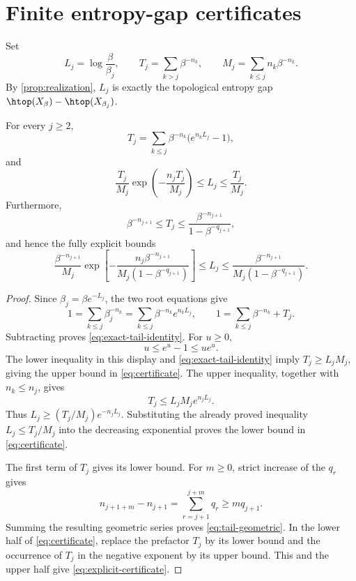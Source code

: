 \section{Finite entropy-gap certificates}
\label{sec:certificates}

Set
\begin{equation}
 L_j=\log\frac{\beta}{\beta_j},\qquad
 T_j=\sum_{k>j}\beta^{-n_k},\qquad
 M_j=\sum_{k\leq j}n_k\beta^{-n_k}.
 \label{eq:LTM}
\end{equation}
By \cref{prop:realization}, $L_j$ is exactly the topological entropy gap $\htop(X_\beta)-\htop(X_{\beta_j})$.

\begin{theorem}
\label{thm:finite-certificate}
For every $j\geq2$,
\begin{equation}
 T_j=\sum_{k\leq j}\beta^{-n_k}\bigl(e^{n_kL_j}-1\bigr),
 \label{eq:exact-tail-identity}
\end{equation}
and
\begin{equation}
 \boxed{
 \frac{T_j}{M_j}\exp\!\left(-\frac{n_jT_j}{M_j}\right)
 \leq L_j\leq\frac{T_j}{M_j}.}
 \label{eq:certificate}
\end{equation}
Furthermore,
\begin{equation}
 \beta^{-n_{j+1}}\leq T_j\leq
 \frac{\beta^{-n_{j+1}}}{1-\beta^{-q_{j+1}}},
 \label{eq:tail-geometric}
\end{equation}
and hence the fully explicit bounds
\begin{equation}
 \frac{\beta^{-n_{j+1}}}{M_j}
 \exp\!\left[
 -\frac{n_j\beta^{-n_{j+1}}}
 {M_j(1-\beta^{-q_{j+1}})}\right]
 \leq L_j\leq
 \frac{\beta^{-n_{j+1}}}
 {M_j(1-\beta^{-q_{j+1}})}.
 \label{eq:explicit-certificate}
\end{equation}
\end{theorem}

\begin{proof}
Since $\beta_j=\beta e^{-L_j}$, the two root equations give
\[
 1=\sum_{k\leq j}\beta_j^{-n_k}
  =\sum_{k\leq j}\beta^{-n_k}e^{n_kL_j},
 \qquad
 1=\sum_{k\leq j}\beta^{-n_k}+T_j.
\]
Subtracting proves \eqref{eq:exact-tail-identity}.  For $u\geq0$,
\[
 u\leq e^u-1\leq ue^u.
\]
The lower inequality in this display and \eqref{eq:exact-tail-identity} imply $T_j\geq L_jM_j$, giving the upper bound in \eqref{eq:certificate}.  The upper inequality, together with $n_k\leq n_j$, gives
\[
 T_j\leq L_jM_je^{n_jL_j}.
\]
Thus $L_j\geq(T_j/M_j)e^{-n_jL_j}$.  Substituting the already proved inequality $L_j\leq T_j/M_j$ into the decreasing exponential proves the lower bound in \eqref{eq:certificate}.

The first term of $T_j$ gives its lower bound.  For $m\geq0$, strict increase of the $q_r$ gives
\[
 n_{j+1+m}-n_{j+1}
 =\sum_{r=j+1}^{j+m}q_r\geq mq_{j+1}.
\]
Summing the resulting geometric series proves \eqref{eq:tail-geometric}.  In the lower half of \eqref{eq:certificate}, replace the prefactor $T_j$ by its lower bound and the occurrence of $T_j$ in the negative exponent by its upper bound.  This and the upper half give \eqref{eq:explicit-certificate}.
\end{proof}

